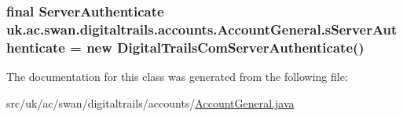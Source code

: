 \hypertarget{classuk_1_1ac_1_1swan_1_1digitaltrails_1_1accounts_1_1_account_general_a9b2086712fd77bc10d704670f5245131}{
\subsubsection[{s\+Server\+Authenticate}]{\setlength{\rightskip}{0pt plus 5cm}final {\bf Server\+Authenticate} uk.\+ac.\+swan.\+digitaltrails.\+accounts.\+Account\+General.\+s\+Server\+Authenticate = new {\bf Digital\+Trails\+Com\+Server\+Authenticate}()\hspace{0.3cm}{\ttfamily [static]}}}\label{classuk_1_1ac_1_1swan_1_1digitaltrails_1_1accounts_1_1_account_general_a9b2086712fd77bc10d704670f5245131}


The documentation for this class was generated from the following file\+:\begin{DoxyCompactItemize}
\item 
src/uk/ac/swan/digitaltrails/accounts/\hyperlink{_account_general_8java}{Account\+General.\+java}\end{DoxyCompactItemize}
